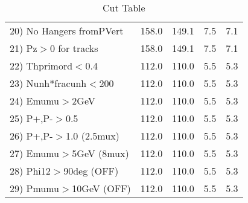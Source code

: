 \begin{table}[h!]
\begin{tabular}{||l||r|r|r|r||}
 20) No Hangers fromPVert &       158.0 &       149.1 &         7.5 &         7.1 \\
 21) Pz$>$0 for tracks    &       158.0 &       149.1 &         7.5 &         7.1 \\
 22) Thprimord$<$0.4      &       112.0 &       110.0 &         5.5 &         5.3 \\
 23) Nunh*fracunh$<$200   &       112.0 &       110.0 &         5.5 &         5.3 \\
 24) Emumu$>$2GeV         &       112.0 &       110.0 &         5.5 &         5.3 \\
 25) P+,P-$>$0.5          &       112.0 &       110.0 &         5.5 &         5.3 \\
 26) P+,P-$>$1.0 (2.5mux) &       112.0 &       110.0 &         5.5 &         5.3 \\
 27) Emumu$>$5GeV  (8mux) &       112.0 &       110.0 &         5.5 &         5.3 \\
 28) Phi12$>$90deg  (OFF) &       112.0 &       110.0 &         5.5 &         5.3 \\
 29) Pmumu$>$10GeV  (OFF) &       112.0 &       110.0 &         5.5 &         5.3 \\
 \hline
 \hline
 \end{tabular}
 \caption{Cut Table \cohrp  }
 \label{tab-cut_crhop}
 \end{table}
